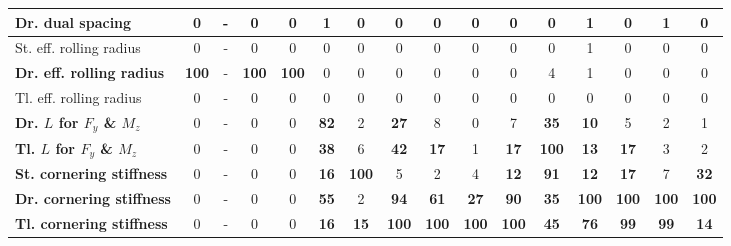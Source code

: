 \begin{table}[H]
\begin{tabular}{|l|c|c|c|c|c|c|c|c|c|c|c|c|c|c|c|}
\hline
Dr. dual spacing & 0 & - & 0 & 0 & 1 & 0 & 0 & 0 & 0 & 0 & 0 & 1 & 0 & 1 & 0 \\
\hline
St. eff. rolling radius & 0 & - & 0 & 0 & 0 & 0 & 0 & 0 & 0 & 0 & 0 & 1 & 0 & 0 & 0 \\
\hline
\textcolor[rgb]{0.851, 0.373, 0.008}{\textbf{Dr. eff. rolling radius}} & \textcolor[rgb]{0.835, 0.369, 0.000}{\textbf{100}} & - & \textcolor[rgb]{0.835, 0.369, 0.000}{\textbf{100}} & \textcolor[rgb]{0.835, 0.369, 0.000}{\textbf{100}} & 0 & 0 & 0 & 0 & 0 & 0 & 4 & 1 & 0 & 0 & 0 \\
\hline
Tl. eff. rolling radius & 0 & - & 0 & 0 & 0 & 0 & 0 & 0 & 0 & 0 & 0 & 0 & 0 & 0 & 0 \\
\hline
\textcolor[rgb]{0.000, 0.447, 0.698}{\textbf{Dr. $L$ for $F_y$ \& $M_z$}} & 0 & - & 0 & 0 & \textcolor[rgb]{0.000, 0.447, 0.698}{\textbf{82}} & 2 & \textcolor[rgb]{0.000, 0.620, 0.451}{\textbf{27}} & 8 & 0 & 7 & \textcolor[rgb]{0.000, 0.620, 0.451}{\textbf{35}} & \textbf{10} & 5 & 2 & 1 \\
\hline
\textcolor[rgb]{0.851, 0.373, 0.008}{\textbf{Tl. $L$ for $F_y$ \& $M_z$}} & 0 & - & 0 & 0 & \textcolor[rgb]{0.000, 0.620, 0.451}{\textbf{38}} & 6 & \textcolor[rgb]{0.000, 0.620, 0.451}{\textbf{42}} & \textbf{17} & 1 & \textbf{17} & \textcolor[rgb]{0.835, 0.369, 0.000}{\textbf{100}} & \textbf{13} & \textbf{17} & 3 & 2 \\
\hline
\textcolor[rgb]{0.851, 0.373, 0.008}{\textbf{St. cornering stiffness}} & 0 & - & 0 & 0 & \textbf{16} & \textcolor[rgb]{0.835, 0.369, 0.000}{\textbf{100}} & 5 & 2 & 4 & \textbf{12} & \textcolor[rgb]{0.000, 0.447, 0.698}{\textbf{91}} & \textbf{12} & \textbf{17} & 7 & \textcolor[rgb]{0.000, 0.620, 0.451}{\textbf{32}} \\
\hline
\textcolor[rgb]{0.851, 0.373, 0.008}{\textbf{Dr. cornering stiffness}} & 0 & - & 0 & 0 & \textcolor[rgb]{0.000, 0.447, 0.698}{\textbf{55}} & 2 & \textcolor[rgb]{0.000, 0.447, 0.698}{\textbf{94}} & \textcolor[rgb]{0.000, 0.447, 0.698}{\textbf{61}} & \textcolor[rgb]{0.000, 0.620, 0.451}{\textbf{27}} & \textcolor[rgb]{0.000, 0.447, 0.698}{\textbf{90}} & \textcolor[rgb]{0.000, 0.620, 0.451}{\textbf{35}} & \textcolor[rgb]{0.835, 0.369, 0.000}{\textbf{100}} & \textcolor[rgb]{0.835, 0.369, 0.000}{\textbf{100}} & \textcolor[rgb]{0.835, 0.369, 0.000}{\textbf{100}} & \textcolor[rgb]{0.835, 0.369, 0.000}{\textbf{100}} \\
\hline
\textcolor[rgb]{0.851, 0.373, 0.008}{\textbf{Tl. cornering stiffness}} & 0 & - & 0 & 0 & \textbf{16} & \textbf{15} & \textcolor[rgb]{0.835, 0.369, 0.000}{\textbf{100}} & \textcolor[rgb]{0.835, 0.369, 0.000}{\textbf{100}} & \textcolor[rgb]{0.835, 0.369, 0.000}{\textbf{100}} & \textcolor[rgb]{0.835, 0.369, 0.000}{\textbf{100}} & \textcolor[rgb]{0.000, 0.620, 0.451}{\textbf{45}} & \textcolor[rgb]{0.000, 0.447, 0.698}{\textbf{76}} & \textcolor[rgb]{0.000, 0.447, 0.698}{\textbf{99}} & \textcolor[rgb]{0.000, 0.447, 0.698}{\textbf{99}} & \textbf{14} \\

\end{tabular}
\end{table}
